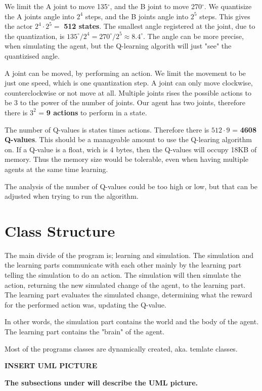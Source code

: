 \documentclass{article}
\begin{document}
We limit the A joint to move 135$^\circ$, and the B joint to move
270$^\circ$. We quantisize the A joints angle into $2^4$ steps, and
the B joints angle into $2^5$ steps. This gives the actor
$2^4 \cdot 2^5 =$ \textbf{512 states}. The smallest angle registered at
the joint, due to the quantization, is
$135^\circ / 2^4 = 270^\circ / 2^5 \approx 8.4^\circ$.
The angle can be more precise, when simulating the agent, but the
Q-learning algorith will just "see" the quantizised angle.

A joint can be moved, by performing an action. We limit the movement to be
just one speed, which is one quantization step. A joint can only move
clockwise, counterclockwise or not move at all. Multiple joints rises the
possible actions to be 3 to the power of the number of joints. Our
agent has two joints, therefore there is $3^2$ = \textbf{9 actions} to
perform in a state.

The number of Q-values is states times actions. Therefore there is
$512 \cdot 9$ = \textbf{4608 Q-values}. This should be a manageable
amount to use the Q-learing algorithm on. If a Q-value is a float,
wich is 4 bytes, then the Q-values will occupy 18KB of memory.
Thus the memory size would be tolerable, even when having multiple agents
at the same time learning.

The analysis of the number of Q-values could be too high or low, but that
can be adjusted when trying to run the algorithm.



\section{Class Structure}
The main divide of the program is; learning and simulation. The
simulation and the learning parts communicate with each other mainly by the
learning part telling the simulation to do an action. The simulation will then
simulate the action, returning the new simulated change of the agent, to the
learning part. The learning part evaluates the simulated change, determining
what the reward for the performed action was, updating the Q-value.

In other words, the simulation part contains the world and the body of the agent.
The learning part contains the "brain" of the agent.

Most of the programs classes are dynamically created, aka. temlate classes.

\textbf{INSERT UML PICTURE}

\textbf{The subsections under will describe the UML picture.}
\end{document}
